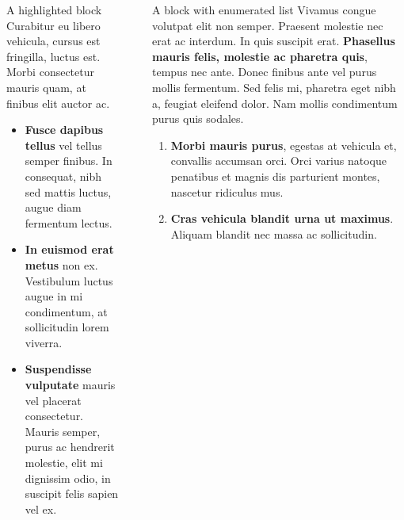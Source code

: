 \documentclass[final]{beamer}
\newlength{\sepwidth}
\newlength{\colwidth}
\newcommand{\separatorcolumn}{\begin{column}{\sepwidth}\end{column}}
\begin{document}
\begin{frame}[t]
\begin{columns}[t]
\begin{column}{\colwidth}
\begin{alertblock}{A highlighted block}
    Curabitur eu libero vehicula, cursus est fringilla, luctus est. Morbi
    consectetur mauris quam, at finibus elit auctor ac. 

    \begin{itemize}
      \item \textbf{Fusce dapibus tellus} vel tellus semper finibus. In
        consequat, nibh sed mattis luctus, augue diam fermentum lectus.
      \item \textbf{In euismod erat metus} non ex. Vestibulum luctus augue in
        mi condimentum, at sollicitudin lorem viverra.
      \item \textbf{Suspendisse vulputate} mauris vel placerat consectetur.
        Mauris semper, purus ac hendrerit molestie, elit mi dignissim odio, in
        suscipit felis sapien vel ex.
    \end{itemize}

  \end{alertblock}
\end{column}

\separatorcolumn
\begin{column}{\colwidth}

  \begin{block}{A block with enumerated list}
    Vivamus congue volutpat elit non semper. Praesent molestie nec erat ac
    interdum. In quis suscipit erat. \textbf{Phasellus mauris felis, molestie
    ac pharetra quis}, tempus nec ante. Donec finibus ante vel purus mollis
    fermentum. Sed felis mi, pharetra eget nibh a, feugiat eleifend dolor. Nam
    mollis condimentum purus quis sodales. 
    
    

    \begin{enumerate}
      \item \textbf{Morbi mauris purus}, egestas at vehicula et, convallis
        accumsan orci. Orci varius natoque penatibus et magnis dis parturient
        montes, nascetur ridiculus mus.
      \item \textbf{Cras vehicula blandit urna ut maximus}. Aliquam blandit nec
        massa ac sollicitudin. 
    \end{enumerate}


\end{block}
\end{column}
\end{columns}
\end{frame}
\end{document}
